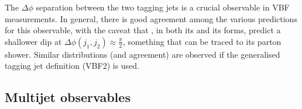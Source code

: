 The $\Delta\phi$ separation between the two tagging jets is a crucial
observable in VBF measurements.
In general, there is good agreement among the various predictions for
this observable, with the caveat
that \Sherpa, in both its \NNLOPS and its \MEPSatNLO forms, predict a
shallower dip at $\Delta\phi(j_1,j_2)\approx\tfrac{\pi}{2}$, something
that can be traced to its parton shower. Similar distributions (and
agreement) are observed if the generalised tagging jet definition
(VBF2) is used.







\clearpage
\subsection{Multijet observables}
\label{sec:hjetscomp:results:mjobs}

